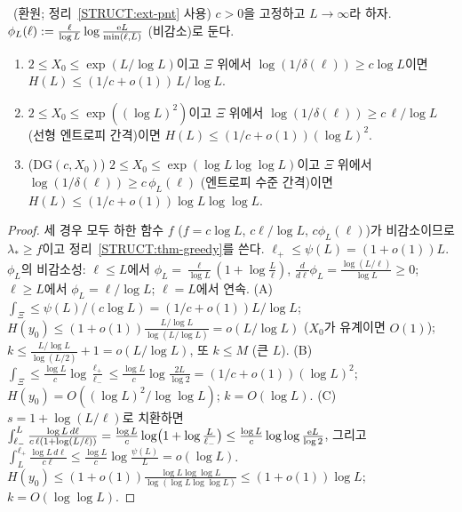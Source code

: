 \begin{theorem}[세 체제]\label{STRUCT:thm-regimes}
\PROVED\ (환원; 정리~\ref{STRUCT:ext-pnt} 사용) $c>0$을 고정하고 $L\to\infty$라 하자. $\phi_L(\ell):=\frac{\ell}{\log L}\log\frac{\mathrm{e} L}{\min(\ell,L)}$ (비감소)로 둔다.
\begin{enumerate}[label=(\Alph*)]
\item $2\le X_0\le\exp(L/\log L)$이고 $\Xi$ 위에서 $\log(1/\delta(\ell))\ge c\log L$이면 $H(L)\le(1/c+o(1))\,L/\log L$.
\item $2\le X_0\le\exp((\log L)^2)$이고 $\Xi$ 위에서 $\log(1/\delta(\ell))\ge c\,\ell/\log L$ (선형 엔트로피 간격)이면 $H(L)\le(1/c+o(1))(\log L)^2$.
\item ($\mathrm{DG}(c,X_0)$) $2\le X_0\le\exp(\log L\log\log L)$이고 $\Xi$ 위에서 $\log(1/\delta(\ell))\ge c\,\phi_L(\ell)$ (엔트로피 수준 간격)이면 $H(L)\le(1/c+o(1))\log L\log\log L$.
\end{enumerate}
\end{theorem}
\begin{proof}
세 경우 모두 하한 함수 $f$ ($f=c\log L$, $c\ell/\log L$, $c\phi_L(\ell)$)가 비감소이므로 $\lambda_*\ge f$이고 정리~\ref{STRUCT:thm-greedy}를 쓴다. $\ell_+\le\psi(L)=(1+o(1))L$.
$\phi_L$의 비감소성: $\ell\le L$에서 $\phi_L=\frac{\ell}{\log L}(1+\log\frac L\ell)$, $\frac{d}{d\ell}\phi_L=\frac{\log(L/\ell)}{\log L}\ge0$; $\ell\ge L$에서 $\phi_L=\ell/\log L$; $\ell=L$에서 연속.
(A) $\int_\Xi\le\psi(L)/(c\log L)=(1/c+o(1))L/\log L$; $H(y_0)\le(1+o(1))\frac{L/\log L}{\log(L/\log L)}=o(L/\log L)$ ($X_0$가 유계이면 $O(1)$); $k\le\frac{L/\log L}{\log(L/2)}+1=o(L/\log L)$, 또 $k\le M$ (큰 $L$).
(B) $\int_\Xi\le\frac{\log L}c\log\frac{\ell_+}{\ell_-}\le\frac{\log L}{c}\log\frac{2L}{\log2}=(1/c+o(1))(\log L)^2$; $H(y_0)=O((\log L)^2/\log\log L)$; $k=O(\log L)$.
(C) $s=1+\log(L/\ell)$로 치환하면 $\int_{\ell_-}^{L}\frac{\log L\,d\ell}{c\,\ell(1+\log(L/\ell))}=\frac{\log L}{c}\log\bigl(1+\log\frac{L}{\ell_-}\bigr)\le\frac{\log L}{c}\log\log\frac{\mathrm{e} L}{\log 2}$, 그리고 $\int_L^{\ell_+}\frac{\log L\,d\ell}{c\ell}\le\frac{\log L}c\log\frac{\psi(L)}{L}=o(\log L)$. $H(y_0)\le(1+o(1))\frac{\log L\log\log L}{\log(\log L\log\log L)}\le(1+o(1))\log L$; $k=O(\log\log L)$.
\end{proof}

